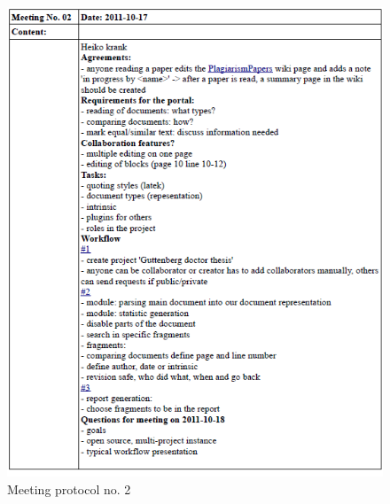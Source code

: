 \begin{appendix}
\begin{figure}
  \centering
    \includegraphics[width=\textwidth]{images/a_meetings/meeting_02.png}
  \caption{Meeting protocol no. 2}
  \label{fig:meeting protocol no. 2}
\end{figure}


\end{appendix}
